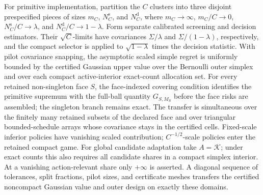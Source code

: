 For primitive implementation, partition the \(C\) clusters into three disjoint prespecified pieces of sizes \(m_C\), \(N_C^{\mathrm s}\), and \(N_C^{\mathrm d}\), where \(m_C\to\infty\), \(m_C/C\to0\), \(N_C^{\mathrm s}/C\to\lambda\), and \(N_C^{\mathrm d}/C\to1-\lambda\).  Form separate calibrated screening and decision estimators.  Their \(\sqrt C\)-limits have covariances \(\Sigma/\lambda\) and \(\Sigma/(1-\lambda)\), respectively, and the compact selector is applied to \(\sqrt{1-\lambda}\) times the decision statistic.  With pilot covariance snapping, the asymptotic scaled simple regret is uniformly bounded by the certified Gaussian upper value over the Bernoulli outer simplex and over each compact active-interior exact-count allocation set.  For every retained non-singleton face \(S\), the face-indexed covering condition identifies the primitive supremum with the full-ball quantity \(G_{S,M_S}\) before the face risks are assembled; the singleton branch remains exact.  The transfer is simultaneous over the finitely many retained subsets of the declared face and over triangular bounded-schedule arrays whose covariance stays in the certified cells.  Fixed-scale inferior policies have vanishing scaled contribution; \(C^{-1/2}\)-scale policies enter the retained compact game.  For global candidate adaptation take \(A=\mathcal K\); under exact counts this also requires all candidate shares in a compact simplex interior.  At a vanishing action-relevant share only \(+\infty\) is asserted.  A diagonal sequence of tolerances, split fractions, pilot sizes, and certificate meshes transfers the certified noncompact Gaussian value and outer design on exactly these domains.